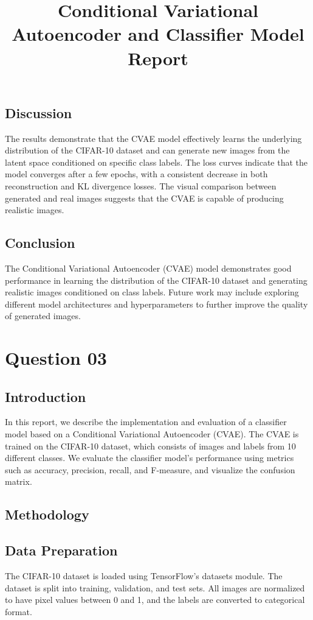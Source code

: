 \documentclass{article}
\begin{document}
\subsection{Discussion}
The results demonstrate that the CVAE model effectively learns the underlying distribution of the CIFAR-10 dataset and can generate new images from the latent space conditioned on specific class labels. The loss curves indicate that the model converges after a few epochs, with a consistent decrease in both reconstruction and KL divergence losses. The visual comparison between generated and real images suggests that the CVAE is capable of producing realistic images.

\subsection{Conclusion}
The Conditional Variational Autoencoder (CVAE) model demonstrates good performance in learning the distribution of the CIFAR-10 dataset and generating realistic images conditioned on class labels. Future work may include exploring different model architectures and hyperparameters to further improve the quality of generated images.








\section{Question 03}

\title{Conditional Variational Autoencoder and Classifier Model Report}

\subsection{Introduction}
In this report, we describe the implementation and evaluation of a classifier model based on a Conditional Variational Autoencoder (CVAE). The CVAE is trained on the CIFAR-10 dataset, which consists of images and labels from 10 different classes. We evaluate the classifier model's performance using metrics such as accuracy, precision, recall, and F-measure, and visualize the confusion matrix.

\subsection{Methodology}

\subsection{Data Preparation}
The CIFAR-10 dataset is loaded using TensorFlow's datasets module. The dataset is split into training, validation, and test sets. All images are normalized to have pixel values between 0 and 1, and the labels are converted to categorical format.
\end{document}
